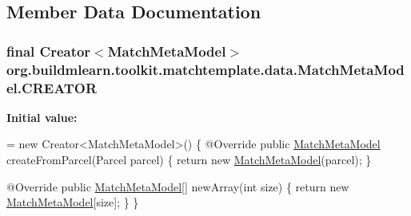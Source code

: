 \subsection{Member Data Documentation}
\subsubsection[{\texorpdfstring{C\+R\+E\+A\+T\+OR}{CREATOR}}]{\setlength{\rightskip}{0pt plus 5cm}final Creator$<${\bf Match\+Meta\+Model}$>$ org.\+buildmlearn.\+toolkit.\+matchtemplate.\+data.\+Match\+Meta\+Model.\+C\+R\+E\+A\+T\+OR\hspace{0.3cm}{\ttfamily [static]}}\hypertarget{classorg_1_1buildmlearn_1_1toolkit_1_1matchtemplate_1_1data_1_1MatchMetaModel_a32398334ccbf1ac8777e087fa31f720a}{}\label{classorg_1_1buildmlearn_1_1toolkit_1_1matchtemplate_1_1data_1_1MatchMetaModel_a32398334ccbf1ac8777e087fa31f720a}
{\bfseries Initial value\+:}
\begin{DoxyCode}
= \textcolor{keyword}{new} Creator<MatchMetaModel>() \{
        @Override
        \textcolor{keyword}{public} \hyperlink{classorg_1_1buildmlearn_1_1toolkit_1_1matchtemplate_1_1data_1_1MatchMetaModel_a6090e69d89fffb96d2914e005c06210a}{MatchMetaModel} createFromParcel(Parcel parcel) \{
            \textcolor{keywordflow}{return} \textcolor{keyword}{new} \hyperlink{classorg_1_1buildmlearn_1_1toolkit_1_1matchtemplate_1_1data_1_1MatchMetaModel_a6090e69d89fffb96d2914e005c06210a}{MatchMetaModel}(parcel);
        \}

        @Override
        \textcolor{keyword}{public} \hyperlink{classorg_1_1buildmlearn_1_1toolkit_1_1matchtemplate_1_1data_1_1MatchMetaModel_a6090e69d89fffb96d2914e005c06210a}{MatchMetaModel}[] newArray(\textcolor{keywordtype}{int} size) \{
            \textcolor{keywordflow}{return} \textcolor{keyword}{new} \hyperlink{classorg_1_1buildmlearn_1_1toolkit_1_1matchtemplate_1_1data_1_1MatchMetaModel_a6090e69d89fffb96d2914e005c06210a}{MatchMetaModel}[size];
        \}
    \}
\end{DoxyCode}
